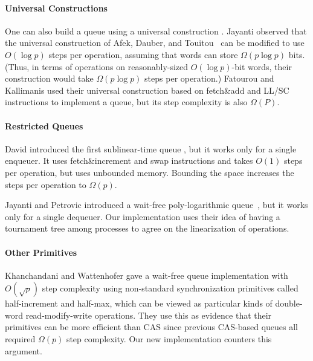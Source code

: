 \paragraph{Universal Constructions}
One can also build a queue using a universal construction \cite{10.1145/114005.102808}.
Jayanti \cite{DBLP:conf/podc/Jayanti98a} observed that
the universal construction of Afek, Dauber, and
Touitou~\cite{DBLP:conf/stoc/AfekDT95} can be modified to use $O(\log p)$ steps per operation, 
assuming that words can store $\Omega(p \log p)$ bits. 
(Thus, in terms of operations on reasonably-sized $O(\log p)$-bit words, their construction would take $\Omega(p\log p)$ steps per operation.)
Fatourou and Kallimanis \cite{FK14} used their universal construction based on fetch\&add and LL/SC instructions
to implement a queue, but its step complexity is also $\Omega(P)$.

\paragraph{Restricted Queues}
David introduced the first sublinear-time queue
\cite{DBLP:conf/wdag/David04}, but it works only for a single enqueuer.
It uses fetch\&increment and swap  instructions and takes $O(1)$ steps per operation, but
uses unbounded memory.  Bounding the space increases the steps per operation to $\Omega(p)$.

Jayanti and Petrovic introduced a wait-free poly-logarithmic
queue~\cite{DBLP:conf/fsttcs/JayantiP05}, but it works only for a single dequeuer. 
Our implementation uses their idea of having
a tournament tree among processes to agree on the linearization of
operations.


\paragraph{Other Primitives}
Khanchandani and Wattenhofer \cite{KW18} gave a wait-free queue implementation
with $O(\sqrt{p})$ step complexity using non-standard synchronization primitives
called half-increment and half-max, which can be viewed as particular kinds of
double-word read-modify-write operations.
They use this as evidence that their primitives can be more efficient than CAS
since previous CAS-based queues all required $\Omega(p)$ step complexity.
Our new implementation counters this argument.

